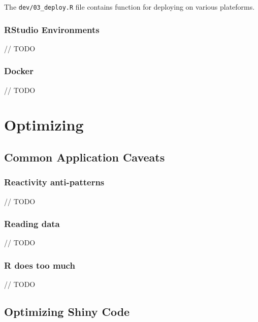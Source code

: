 \documentclass[]{book}
\begin{document}
The \texttt{dev/03\_deploy.R} file contains function for deploying on various plateforms.

\hypertarget{rstudio-environments}{%
\section{RStudio Environments}\label{rstudio-environments}}

// TODO

\hypertarget{docker}{%
\section{Docker}\label{docker}}

// TODO

\hypertarget{part-optimizing}{%
\part{Optimizing}\label{part-optimizing}}

\hypertarget{optim-caveat}{%
\chapter{Common Application Caveats}\label{optim-caveat}}

\hypertarget{reactivity-anti-patterns}{%
\section{Reactivity anti-patterns}\label{reactivity-anti-patterns}}

// TODO

\hypertarget{reading-data}{%
\section{Reading data}\label{reading-data}}

// TODO

\hypertarget{r-does-too-much}{%
\section{R does too much}\label{r-does-too-much}}

// TODO

\hypertarget{optimizing-shiny-code}{%
\chapter{Optimizing Shiny Code}\label{optimizing-shiny-code}}
\end{document}
